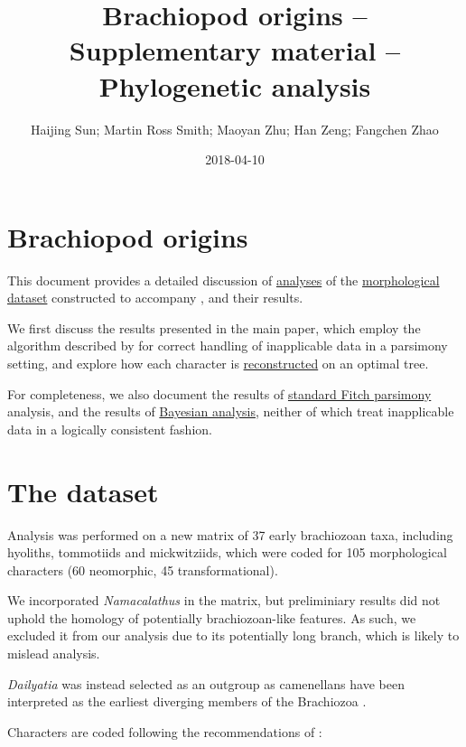 \documentclass[]{book}
\title{Brachiopod origins -- Supplementary material -- Phylogenetic analysis}
\author{Haijing Sun; Martin Ross Smith; Maoyan Zhu; Han Zeng; Fangchen Zhao}
\date{2018-04-10}
\theoremstyle{definition}
\theoremstyle{definition}
\theoremstyle{definition}
\theoremstyle{remark}
\begin{document}
\maketitle

{
\setcounter{tocdepth}{1}
\tableofcontents
}
\hypertarget{brachiopod-origins}{%
\chapter*{Brachiopod origins}\label{brachiopod-origins}}

This document provides a detailed discussion of
\protect\hyperlink{treesearch}{analyses} of the
\protect\hyperlink{dataset}{morphological dataset} constructed to
accompany \citet{Sun2018Hyolithswith}, and their results.

We first discuss the results presented in the main paper, which employ
the algorithm described by \citet{Brazeau2018} for correct handling of
inapplicable data in a parsimony setting, and explore how each character
is \protect\hyperlink{reconstructions}{reconstructed} on an optimal
tree.

For completeness, we also document the results of
\protect\hyperlink{fitch}{standard Fitch parsimony} analysis, and the
results of \protect\hyperlink{bayesian}{Bayesian analysis}, neither of
which treat inapplicable data in a logically consistent fashion.

\hypertarget{dataset}{%
\chapter{The dataset}\label{dataset}}

Analysis was performed on a new matrix of 37 early brachiozoan taxa,
including hyoliths, tommotiids and mickwitziids, which were coded for
105 morphological characters (60 neomorphic, 45 transformational).

We incorporated \emph{Namacalathus} in the matrix, but preliminiary
results did not uphold the homology of potentially brachiozoan-like
features. As such, we excluded it from our analysis due to its
potentially long branch, which is likely to mislead analysis.

\emph{Dailyatia} was instead selected as an outgroup as camenellans have
been interpreted as the earliest diverging members of the Brachiozoa
\citep{Skovsted2015Theearly, Zhao2017}.

Characters are coded following the recommendations of
\citet{Brazeau2018}:
\end{document}
